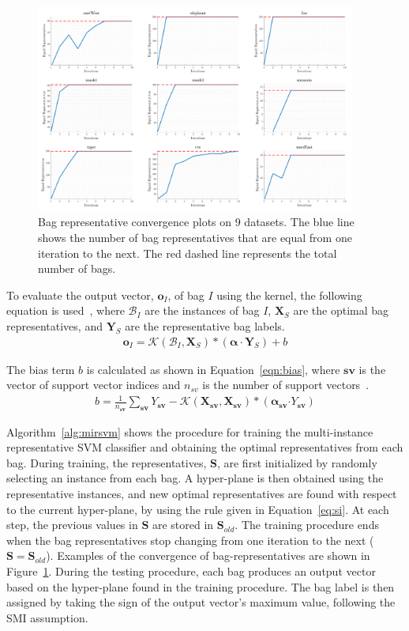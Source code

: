 \documentclass[preprint,12pt]{elsarticle}
\newcommand{\spa}[1]{\mathcal{#1}}
\begin{document}
\newpage
\begin{figure}
\centering
\label{fig:convegence}
\includegraphics[width=0.94\textwidth]{convergence.png} 
\caption{Bag representative convergence plots on 9 datasets. The blue line shows the number of bag representatives that are equal from one iteration to the next. The red dashed line represents the total number of bags.}
\end{figure}
To evaluate the output vector, $\bm o_I$, of bag $I$ using the kernel, the following equation is used~\citep{Huang2006}, where $\mathcal{B}_I$ are the instances of bag $I$, $\bm X_S$ are the optimal bag representatives, and $\bm Y_S$ are the representative bag labels.
\begin{align}
\bm o_I = \spa{K}(\mathcal{B}_I,\bm X_S)*(\bm\alpha \cdot \bm Y_S) + b
\end{align}

The bias term $b$ is calculated as shown in Equation~\eqref{eqn:bias}, where $\bm{sv}$ is the vector of support vector indices and $n_{sv}$ is the number of support vectors~\citep{Huang2006}.
\begin{align}
\label{eqn:bias}
b = \frac{1}{n_{\bm{sv}}}\sum_{\bm{sv}} Y_{\bm{sv}} - \spa{K}(\bm X_{\bm{sv}},\bm X_{\bm{sv}})*(\bm \alpha_{\bm{sv}}\bm\cdot Y_{\bm{sv}})
\end{align}

Algorithm~\ref{alg:mirsvm} shows the procedure for training the multi-instance representative SVM classifier and obtaining the optimal representatives from each bag.  During training, the representatives, $\bm S$, are first initialized by randomly selecting an instance from each bag. A hyper-plane is then obtained using the representative instances, and new optimal representatives are found with respect to the current hyper-plane, by using the rule given in Equation~\eqref{eq:si}. At each step, the previous values in $\bm S$ are stored in $\bm S_{old}$. The training procedure ends when the bag representatives stop changing from one iteration to the next ($\bm S = \bm S_{old}$). Examples of the convergence of bag-representatives are shown in Figure~\ref{fig:convegence}. During the testing procedure, each bag produces an output vector based on the hyper-plane found in the training procedure. The bag label is then assigned by taking the sign of the output vector's maximum value, following the SMI assumption. 
\end{document}
